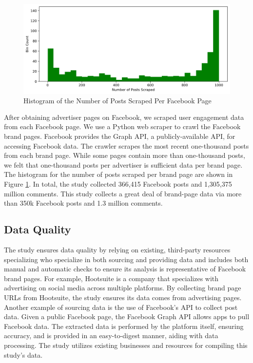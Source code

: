 \documentclass[mksc,blindrev]{informs3} %
\begin{document}
\begin{figure}
    \includegraphics[width=\columnwidth]{images/Posts_Per_Page_Histogram.png}
    \caption{Histogram of the Number of Posts Scraped Per Facebook Page}
    \label{fig:histogram_posts_scraped}
\end{figure}

After obtaining advertiser pages on Facebook, we scraped user engagement data from each Facebook page. We use a Python web scraper to crawl the Facebook brand pages. Facebook provides the Graph API, a publicly-available API, for accessing Facebook data. The crawler scrapes the most recent one-thousand posts from each brand page. While some pages contain more than one-thousand posts, we felt that one-thousand posts per advertiser is sufficient data per brand page. The histogram for the number of posts scraped per brand page are shown in Figure \ref{fig:histogram_posts_scraped}. In total, the study collected 366,415 Facebook posts and 1,305,375 million comments. This study collects a great deal of brand-page data via more than 350k Facebook posts and 1.3 million comments.

\subsection{Data Quality}

The study ensures data quality by relying on existing, third-party resources specializing who specialize in both sourcing and providing data and includes both manual and automatic checks to ensure its analysis is representative of Facebook brand pages. For example, Hootsuite is a company that specializes with advertising on social media across multiple platforms. By collecting brand page URLs from Hootsuite, the study ensures its data comes from advertising pages. Another example of sourcing data is the use of Facebook's API to collect post data. Given a public Facebook page, the Facebook Graph API allows apps to pull Facebook data. The extracted data is performed by the platform itself, ensuring accuracy, and is provided in an easy-to-digest manner, aiding with data processing. The study utilizes existing businesses and resources for compiling this study's data.
\end{document}
